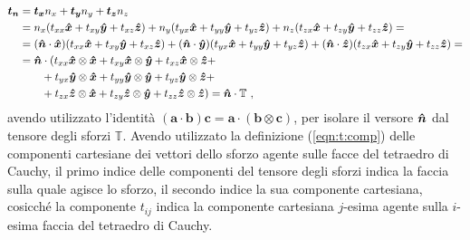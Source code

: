 \begin{equation}
\begin{aligned}
  \bm{t_n} & = \bm{t_x} n_x + \bm{t_y} n_y + \bm{t_z} n_z \\ 
 & = n_x ( t_{xx} \bm{\hat{x}} + t_{xy} \bm{\hat{y}} +  t_{xz} \bm{\hat{z}} ) %
   + n_y ( t_{yx} \bm{\hat{x}} + t_{yy} \bm{\hat{y}} +  t_{yz} \bm{\hat{z}} ) %
   + n_z ( t_{zx} \bm{\hat{x}} + t_{zy} \bm{\hat{y}} +  t_{zz} \bm{\hat{z}} ) = \\
 & = ( \bh{n} \cdot \bh{x} ) ( t_{xx} \bm{\hat{x}} + t_{xy} \bm{\hat{y}} +  t_{xz} \bm{\hat{z}} )%
   + ( \bh{n} \cdot \bh{y} ) ( t_{yx} \bm{\hat{x}} + t_{yy} \bm{\hat{y}} +  t_{yz} \bm{\hat{z}} )%
   + ( \bh{n} \cdot \bh{z} ) ( t_{zx} \bm{\hat{x}} + t_{zy} \bm{\hat{y}} +  t_{zz} \bm{\hat{z}} ) = \\
    & = \bh{n} \cdot ( t_{xx} \bm{\hat{x}} \otimes \bm{\hat{x}} + 
                       t_{xy} \bm{\hat{x}} \otimes \bm{\hat{y}} +
                       t_{xz} \bm{\hat{x}} \otimes \bm{\hat{z}} + \\
            & \qquad + t_{yx} \bm{\hat{y}} \otimes \bm{\hat{x}} + 
                       t_{yy} \bm{\hat{y}} \otimes \bm{\hat{y}} +
                       t_{yz} \bm{\hat{y}} \otimes \bm{\hat{z}} + \\
            & \qquad + t_{zx} \bm{\hat{z}} \otimes \bm{\hat{x}} + 
                       t_{zy} \bm{\hat{z}} \otimes \bm{\hat{y}} +
                       t_{zz} \bm{\hat{z}} \otimes \bm{\hat{z}} ) =
     \bm{\hat{n}} \cdot \mathbb{T}  \ ,
\end{aligned}  
\end{equation}
avendo utilizzato l'identità $(\bm{a} \cdot \bm{b})\bm{c} = \bm{a} \cdot (\bm{b}\otimes\bm{c})$, per isolare il versore $\bm{\hat{n}}$ dal tensore degli sforzi $\mathbb{T}$. Avendo utilizzato la definizione (\ref{eqn:t:comp}) delle componenti cartesiane dei vettori dello sforzo agente sulle facce del tetraedro di Cauchy, il primo indice delle componenti del tensore degli sforzi indica la faccia sulla quale agisce lo sforzo, il secondo indice la sua componente cartesiana, cosicché la componente $t_{ij}$ indica la componente cartesiana $j$-esima agente sulla $i$-esima faccia del tetraedro di Cauchy.
